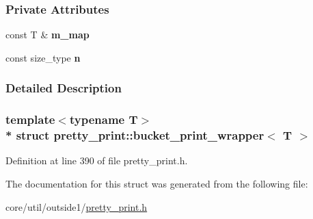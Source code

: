 \subsubsection*{Private Attributes}
\begin{DoxyCompactItemize}
\item 
const T \& {\bfseries m\+\_\+map}\hypertarget{structpretty__print_1_1bucket__print__wrapper_a884243054db0bd2f1b4db504e86bd02d}{}\label{structpretty__print_1_1bucket__print__wrapper_a884243054db0bd2f1b4db504e86bd02d}

\item 
const size\+\_\+type {\bfseries n}\hypertarget{structpretty__print_1_1bucket__print__wrapper_ac5c7a56ecc9ebe0f91a8bb77f4a77afa}{}\label{structpretty__print_1_1bucket__print__wrapper_ac5c7a56ecc9ebe0f91a8bb77f4a77afa}

\end{DoxyCompactItemize}


\subsubsection{Detailed Description}
\subsubsection*{template$<$typename T$>$\\*
struct pretty\+\_\+print\+::bucket\+\_\+print\+\_\+wrapper$<$ T $>$}



Definition at line 390 of file pretty\+\_\+print.\+h.



The documentation for this struct was generated from the following file\+:\begin{DoxyCompactItemize}
\item 
core/util/outside1/\hyperlink{pretty__print_8h}{pretty\+\_\+print.\+h}\end{DoxyCompactItemize}
